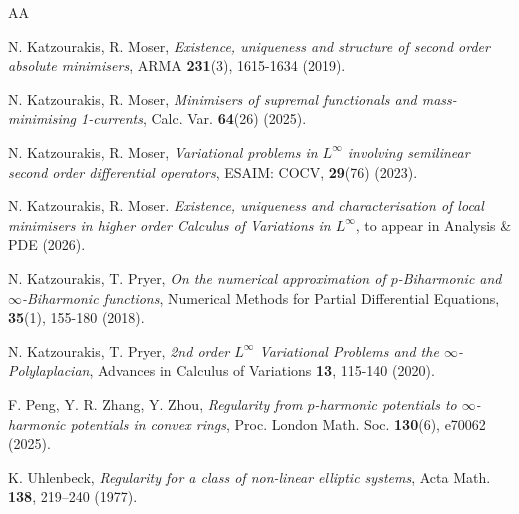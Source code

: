 \documentclass[a4paper,11pt]{article}
\numberwithin{equation}{section}
\theoremstyle{definition}
\begin{document}
\begin{thebibliography}{AA}

N. Katzourakis, R. Moser, {\it Existence, uniqueness and structure of second order absolute minimisers}, ARMA {\bf 231}(3), 1615-1634 (2019).

N. Katzourakis, R. Moser, {\it Minimisers of supremal functionals and mass-minimising 1-currents}, Calc. Var.{ \bf 64}(26) (2025).

N. Katzourakis, R. Moser, {\it Variational problems in $L^\infty$ involving semilinear second order differential operators}, ESAIM: COCV, {\bf 29}(76) (2023).

N. Katzourakis, R. Moser. {\it Existence, uniqueness and characterisation of local minimisers in higher order Calculus of Variations in $L^\infty$}, to appear in Analysis \& PDE (2026).

N. Katzourakis, T. Pryer, {\it On the numerical approximation of $p$-Biharmonic and $\infty$-Biharmonic functions},
Numerical Methods for Partial Differential Equations, {\bf 35}(1), 155-180 (2018).


N. Katzourakis, T. Pryer, {\it 2nd order $L^\infty$ Variational Problems and the $\infty$-Polylaplacian},
Advances in Calculus of Variations {\bf 13}, 115-140 (2020).





F. Peng, Y. R. Zhang, Y. Zhou, \emph{Regularity from $p$-harmonic potentials to $\infty$-harmonic potentials in convex rings}, Proc. London Math. Soc.
\textbf{130}(6), e70062 (2025).




K. Uhlenbeck, {\it Regularity for a class of non-linear elliptic systems}, Acta Math. {\bf138}, 219--240 (1977).



\end{thebibliography}
\end{document}
